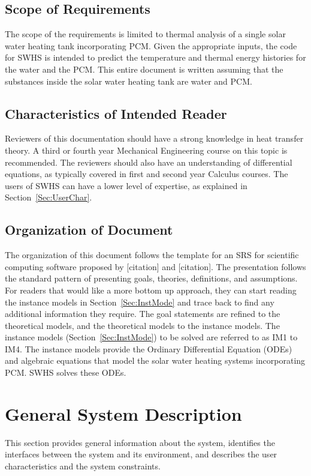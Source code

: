 \documentclass[12pt]{article}
\begin{document}
\subsection{Scope of Requirements}
\label{Sec:ScopofRequ}
The scope of the requirements is limited to thermal analysis of a single solar water heating tank incorporating PCM. Given the appropriate inputs, the code for SWHS is intended to predict the temperature and thermal energy histories for the water and the PCM. This entire document is written assuming that the substances inside the solar water heating tank are water and PCM.
\subsection{Characteristics of Intended Reader}
\label{Sec:CharofInteRead}
Reviewers of this documentation should have a strong knowledge in heat transfer theory. A third or fourth year Mechanical Engineering course on this topic is recommended. The reviewers should also have an understanding of differential equations, as typically covered in first and second year Calculus courses. The users of SWHS can have a lower level of expertise, as explained in Section~\ref{Sec:UserChar}.
\subsection{Organization of Document}
\label{Sec:OrgaofDocu}
The organization of this document follows the template for an SRS for scientific computing software proposed by [citation] and [citation]. The presentation follows the standard pattern of presenting goals, theories, definitions, and assumptions. For readers that would like a more bottom up approach, they can start reading the instance models in Section~\ref{Sec:InstMode} and trace back to find any additional information they require.
The goal statements are refined to the theoretical models, and the theoretical models to the instance models. The instance models (Section~\ref{Sec:InstMode}) to be solved are referred to as IM1 to IM4. The instance models provide the Ordinary Differential Equation (ODEs) and algebraic equations that model the solar water heating systems incorporating PCM. SWHS solves these ODEs.
\section{General System Description}
\label{Sec:GeneSystDesc}
This section provides general information about the system, identifies the interfaces between the system and its environment, and describes the user characteristics and the system constraints.
\end{document}
